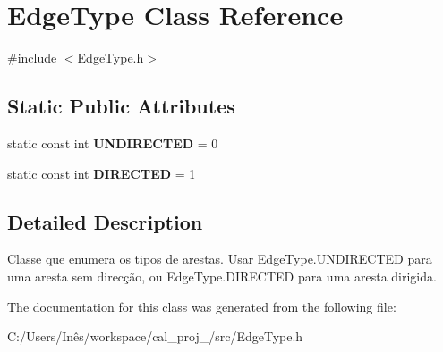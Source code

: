 \hypertarget{class_edge_type}{}\section{Edge\+Type Class Reference}
\label{class_edge_type}


{\ttfamily \#include $<$Edge\+Type.\+h$>$}

\subsection*{Static Public Attributes}
\begin{DoxyCompactItemize}
\item 
\hypertarget{class_edge_type_a6533cc56d05c288a550b9980b66c9317}{}static const int {\bfseries U\+N\+D\+I\+R\+E\+C\+T\+E\+D} = 0\label{class_edge_type_a6533cc56d05c288a550b9980b66c9317}

\item 
\hypertarget{class_edge_type_a903017a534f2818c2d17145e4ae0321c}{}static const int {\bfseries D\+I\+R\+E\+C\+T\+E\+D} = 1\label{class_edge_type_a903017a534f2818c2d17145e4ae0321c}

\end{DoxyCompactItemize}


\subsection{Detailed Description}
Classe que enumera os tipos de arestas. Usar Edge\+Type.\+U\+N\+D\+I\+R\+E\+C\+T\+E\+D para uma aresta sem direcção, ou Edge\+Type.\+D\+I\+R\+E\+C\+T\+E\+D para uma aresta dirigida. 

The documentation for this class was generated from the following file\+:\begin{DoxyCompactItemize}
\item 
C\+:/\+Users/\+Inês/workspace/cal\+\_\+proj\+\_/src/Edge\+Type.\+h\end{DoxyCompactItemize}

